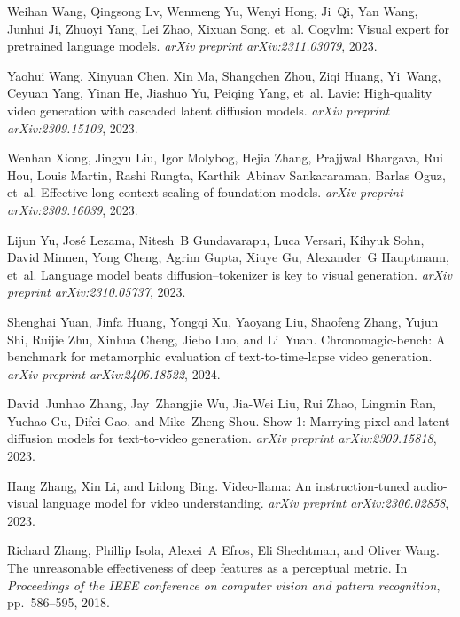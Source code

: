 \documentclass{article} \usepackage{iclr2024_conference,times}
\begin{document}
\begin{thebibliography}{45}
Weihan Wang, Qingsong Lv, Wenmeng Yu, Wenyi Hong, Ji~Qi, Yan Wang, Junhui Ji, Zhuoyi Yang, Lei Zhao, Xixuan Song, et~al.
\newblock Cogvlm: Visual expert for pretrained language models.
\newblock \emph{arXiv preprint arXiv:2311.03079}, 2023{}.

Yaohui Wang, Xinyuan Chen, Xin Ma, Shangchen Zhou, Ziqi Huang, Yi~Wang, Ceyuan Yang, Yinan He, Jiashuo Yu, Peiqing Yang, et~al.
\newblock Lavie: High-quality video generation with cascaded latent diffusion models.
\newblock \emph{arXiv preprint arXiv:2309.15103}, 2023{}.

Wenhan Xiong, Jingyu Liu, Igor Molybog, Hejia Zhang, Prajjwal Bhargava, Rui Hou, Louis Martin, Rashi Rungta, Karthik~Abinav Sankararaman, Barlas Oguz, et~al.
\newblock Effective long-context scaling of foundation models.
\newblock \emph{arXiv preprint arXiv:2309.16039}, 2023.

Lijun Yu, Jos{\'e} Lezama, Nitesh~B Gundavarapu, Luca Versari, Kihyuk Sohn, David Minnen, Yong Cheng, Agrim Gupta, Xiuye Gu, Alexander~G Hauptmann, et~al.
\newblock Language model beats diffusion--tokenizer is key to visual generation.
\newblock \emph{arXiv preprint arXiv:2310.05737}, 2023.

Shenghai Yuan, Jinfa Huang, Yongqi Xu, Yaoyang Liu, Shaofeng Zhang, Yujun Shi, Ruijie Zhu, Xinhua Cheng, Jiebo Luo, and Li~Yuan.
\newblock Chronomagic-bench: A benchmark for metamorphic evaluation of text-to-time-lapse video generation.
\newblock \emph{arXiv preprint arXiv:2406.18522}, 2024.

David~Junhao Zhang, Jay~Zhangjie Wu, Jia-Wei Liu, Rui Zhao, Lingmin Ran, Yuchao Gu, Difei Gao, and Mike~Zheng Shou.
\newblock Show-1: Marrying pixel and latent diffusion models for text-to-video generation.
\newblock \emph{arXiv preprint arXiv:2309.15818}, 2023{}.

Hang Zhang, Xin Li, and Lidong Bing.
\newblock Video-llama: An instruction-tuned audio-visual language model for video understanding.
\newblock \emph{arXiv preprint arXiv:2306.02858}, 2023{}.

Richard Zhang, Phillip Isola, Alexei~A Efros, Eli Shechtman, and Oliver Wang.
\newblock The unreasonable effectiveness of deep features as a perceptual metric.
\newblock In \emph{Proceedings of the IEEE conference on computer vision and pattern recognition}, pp.\  586--595, 2018.


\end{thebibliography}
\end{document}
